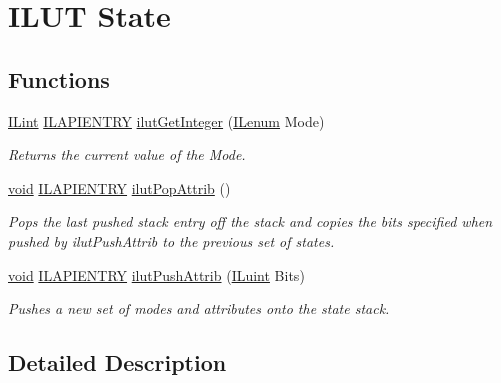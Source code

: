 \hypertarget{group__ilut__state}{\section{I\+L\+U\+T State}
\label{group__ilut__state}
}
\subsection*{Functions}
\begin{DoxyCompactItemize}
\item 
\hyperlink{group__il__types_ga8effe51a00daaa0878631e5af75a36cb}{I\+Lint} \hyperlink{_i_l_8h_a69c08a8d06df986f7e46f209d131ef2f}{I\+L\+A\+P\+I\+E\+N\+T\+R\+Y} \hyperlink{group__ilut__state_ga239431131fb8f750ce210c7546d0d035}{ilut\+Get\+Integer} (\hyperlink{group__il__types_ga62ca73445716183ef42b1f3906a45ed0}{I\+Lenum} Mode)
\begin{DoxyCompactList}\small\item\em Returns the current value of the {\itshape Mode}. \end{DoxyCompactList}\item 
\hyperlink{_i_l_8h_a5530e04d947bcddd83639ea7940faf10}{void} \hyperlink{_i_l_8h_a69c08a8d06df986f7e46f209d131ef2f}{I\+L\+A\+P\+I\+E\+N\+T\+R\+Y} \hyperlink{group__ilut__state_gae638fbd9224912d86a1d2499166295bb}{ilut\+Pop\+Attrib} ()
\begin{DoxyCompactList}\small\item\em Pops the last pushed stack entry off the stack and copies the bits specified when pushed by ilut\+Push\+Attrib to the previous set of states. \end{DoxyCompactList}\item 
\hyperlink{_i_l_8h_a5530e04d947bcddd83639ea7940faf10}{void} \hyperlink{_i_l_8h_a69c08a8d06df986f7e46f209d131ef2f}{I\+L\+A\+P\+I\+E\+N\+T\+R\+Y} \hyperlink{group__ilut__state_gac630c7a042dd4ce6840c7e65bd48901d}{ilut\+Push\+Attrib} (\hyperlink{group__il__types_gaff8e86a1072c8d7cfe387fb87c6ed8e1}{I\+Luint} Bits)
\begin{DoxyCompactList}\small\item\em Pushes a new set of modes and attributes onto the state stack. \end{DoxyCompactList}\end{DoxyCompactItemize}


\subsection{Detailed Description}


